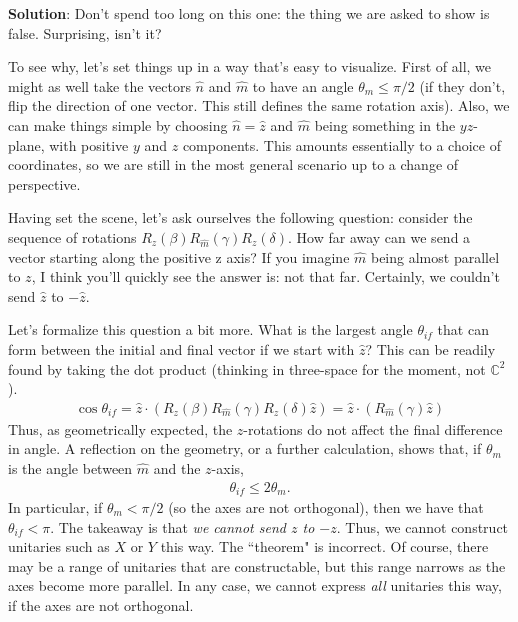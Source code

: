 \documentclass{book}
\begin{document}
    \textbf{Solution}: Don't spend too long on this one: the thing we are asked to show is false. Surprising, isn't it? 
    
    To see why, let's set things up in a way that's easy to visualize. First of all, we might as well take the vectors $\hat{n}$ and $\hat{m}$ to have an angle $\theta_m \leq \pi/2$ (if they don't, flip the direction of one vector. This still defines the same rotation axis). Also, we can make things simple by choosing $\hat{n} = \hat{z}$ and $\hat{m}$ being something in the $yz$-plane, with positive $y$ and $z$ components. This amounts essentially to a choice of coordinates, so we are still in the most general scenario up to a change of perspective.

    Having set the scene, let's ask ourselves the following question: consider the sequence of rotations $R_z(\beta) R_{\hat{m}}(\gamma) R_z(\delta)$. How far away can we send a vector starting along the positive z axis? If you imagine $\hat{m}$ being almost parallel to $z$, I think you'll quickly see the answer is: not that far. Certainly, we couldn't send $\hat{z}$ to $-\hat{z}$. 

    Let's formalize this question a bit more. What is the largest angle $\theta_{if}$ that can form between the initial and final vector if we start with $\hat{z}$? This can be readily found by taking the dot product (thinking in three-space for the moment, not $\mathbb{C}^2$).
    \begin{align}
        \cos \theta_{if} = \hat{z} \cdot (R_z(\beta) R_{\hat{m}}(\gamma) R_z(\delta) \hat{z}) = \hat{z} \cdot (R_{\hat{m}}(\gamma) \hat{z})
    \end{align}
    Thus, as geometrically expected, the $z$-rotations do not affect the final difference in angle. A reflection on the geometry, or a further calculation, shows that, if $\theta_m$ is the angle between $\hat{m}$ and the $z$-axis,
    \begin{align}
        \theta_{if} \leq 2 \theta_m.
    \end{align}
    In particular, if $\theta_m < \pi/2$ (so the axes are not orthogonal), then we have that $\theta_{if} < \pi$. The takeaway is that \emph{we cannot send $z$ to $-z$}. Thus, we cannot construct unitaries such as $X$ or $Y$ this way. The ``theorem" is incorrect. Of course, there may be a range of unitaries that are constructable, but this range narrows as the axes become more parallel. In any case, we cannot express \emph{all} unitaries this way, if the axes are not orthogonal.
\end{document}
